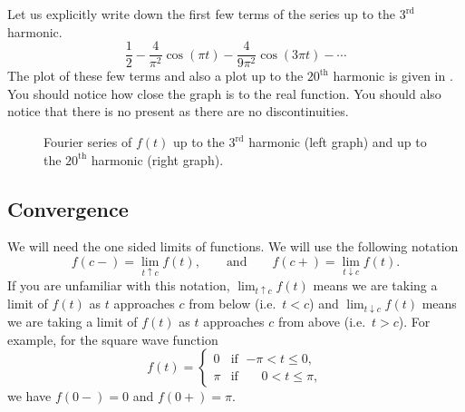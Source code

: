 \begin{example}
Let us explicitly write down the first few terms of the series
up to the $3^{\text{rd}}$ harmonic.
\begin{equation*}
\frac{1}{2} -
\frac{4}{\pi^2} \cos (\pi t)
-
\frac{4}{9 \pi^2} \cos (3 \pi t)
- \cdots
\end{equation*}
The plot of these few terms and also a plot up to the ${20}^{\text{th}}$
harmonic is given in
.  You should notice how close the graph is
to the real function.  You should also notice that there is no
 present as there are no discontinuities.

\begin{figure}[h!t]
\capstart
\begin{center}
\quad
{}
\caption{Fourier series of $f(t)$ up to the $3^{\text{rd}}$ harmonic (left
graph)
and up to the ${20}^{\text{th}}$ harmonic (right graph).\label{gfs:sawcontfsfig}}
\end{center}
\end{figure}
\end{example}

\subsection{Convergence}

We will need the one sided limits of functions.
We will use the following notation
\begin{equation*}
f(c-) = \lim_{t \uparrow c} f(t),
\qquad \text{and} \qquad
f(c+) = \lim_{t \downarrow c} f(t).
\end{equation*}
If you are unfamiliar with this notation,
$\lim_{t \uparrow c} f(t)$ means we are taking a limit of $f(t)$
as $t$ approaches $c$ from below (i.e.\ $t < c$) and
$\lim_{t \downarrow c} f(t)$ means we are taking a limit of $f(t)$
as $t$ approaches $c$ from above (i.e.\ $t > c$).
For example, for the square wave function
\begin{equation} \label{gfs:sqwaveeq}
f(t) =
\begin{cases}
0 & \text{if } \; {-\pi} < t \leq 0 , \\
\pi & \text{if } \; \phantom{-}0 < t \leq \pi ,
\end{cases}
\end{equation}
we have $f(0-) = 0$ and $f(0+) = \pi$.

